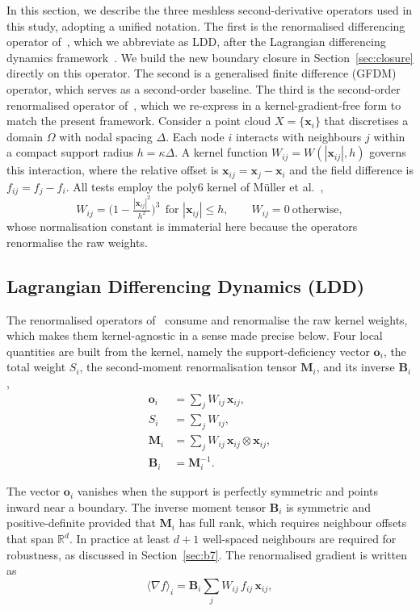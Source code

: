 \documentclass[preprint,review,12pt]{elsarticle}
\newcommand{\xij}{\mathbf{x}_{ij}}
\newcommand{\Mi}{\mathbf{M}_i}
\newcommand{\Bi}{\mathbf{B}_i}
\newcommand{\oi}{\mathbf{o}_i}
\newcommand{\gradop}[1]{\langle\nabla #1\rangle}
\begin{document}
In this section, we describe the three meshless second-derivative operators used in this study, adopting a unified notation.
The first is the renormalised differencing operator of~\cite{Basic2018}, which we abbreviate as LDD, after the Lagrangian differencing dynamics framework~\cite{Basic2022}.
We build the new boundary closure in Section~\ref{sec:closure} directly on this operator.
The second is a generalised finite difference (GFDM) operator, which serves as a second-order baseline.
The third is the second-order renormalised operator of~\cite{Asai2023}, which we re-express in a kernel-gradient-free form to match the present framework.
Consider a point cloud $X=\{\mathbf{x}_i\}$ that discretises a domain $\Omega$ with nodal spacing $\Delta$.
Each node $i$ interacts with neighbours $j$ within a compact support radius $h=\kappa\Delta$.
A kernel function $W_{ij}=W(|\xij|,h)$ governs this interaction, where the relative offset is $\xij=\mathbf{x}_j-\mathbf{x}_i$ and the field difference is $f_{ij}=f_j-f_i$.
All tests employ the poly6 kernel of M\"uller et al.~\cite{Muller2003},
\begin{equation}
  W_{ij}=\Big(1-\tfrac{|\xij|^2}{h^2}\Big)^3\ \ \text{for }|\xij|\le h,
  \qquad W_{ij}=0\ \text{otherwise},
  \label{eq:poly6}
\end{equation}
whose normalisation constant is immaterial here because the operators renormalise the raw weights.

\subsection{Lagrangian Differencing Dynamics (LDD)}
\label{sec:op-ldd}

The renormalised operators of~\cite{Basic2018} consume and renormalise the raw kernel weights, which makes them kernel-agnostic in a sense made precise below.
Four local quantities are built from the kernel, namely the support-deficiency vector $\oi$, the total weight $S_i$, the second-moment renormalisation tensor $\Mi$, and its inverse $\Bi$,
\begin{align}
  \oi &= \sum_j W_{ij}\,\xij, \label{eq:o}\\
  S_i &= \sum_j W_{ij}, \label{eq:Stot}\\
  \Mi &= \sum_j W_{ij}\,\xij\otimes\xij, \label{eq:M}\\
  \Bi &= \Mi^{-1}. \label{eq:B}
\end{align}

The vector $\oi$ vanishes when the support is perfectly symmetric and points inward near a boundary.
The inverse moment tensor $\Bi$ is symmetric and positive-definite provided that $\Mi$ has full rank, which requires neighbour offsets that span $\mathbb{R}^d$.
In practice at least $d+1$ well-spaced neighbours are required for robustness, as discussed in Section~\ref{sec:b7}.
The renormalised gradient is written as
\begin{equation}
  \gradop{f}_i=\Bi\sum_j W_{ij}\,f_{ij}\,\xij,
  \label{eq:grad}
\end{equation}
\end{document}
